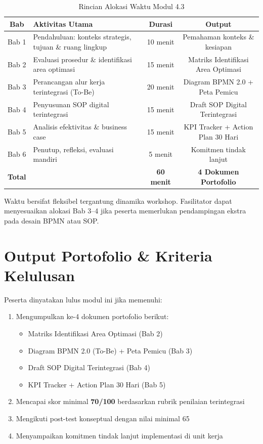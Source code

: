 \documentclass[12pt,a4paper]{report}
\begin{document}
\begin{table}[htbp]
\centering
\small
\caption{Rincian Alokasi Waktu Modul 4.3}
\begin{tabularx}{\textwidth}{@{} c X c c @{}}
\toprule
\textbf{Bab} & \textbf{Aktivitas Utama} & \textbf{Durasi} & \textbf{Output} \\
\midrule
Bab 1 & Pendahuluan: konteks strategis, tujuan \& ruang lingkup & 10 menit & Pemahaman konteks \& kesiapan \\
Bab 2 & Evaluasi prosedur \& identifikasi area optimasi & 15 menit & Matriks Identifikasi Area Optimasi \\
Bab 3 & Perancangan alur kerja terintegrasi (To-Be) & 20 menit & Diagram BPMN 2.0 + Peta Pemicu \\
Bab 4 & Penyusunan SOP digital terintegrasi & 15 menit & Draft SOP Digital Terintegrasi \\
Bab 5 & Analisis efektivitas \& business case & 15 menit & KPI Tracker + Action Plan 30 Hari \\
Bab 6 & Penutup, refleksi, evaluasi mandiri & 5 menit & Komitmen tindak lanjut \\
\midrule
\textbf{Total} & & \textbf{60 menit} & \textbf{4 Dokumen Portofolio} \\
\bottomrule
\end{tabularx}
\end{table}

\begin{warnbox}
Waktu bersifat fleksibel tergantung dinamika workshop. Fasilitator dapat menyesuaikan alokasi Bab 3--4 jika peserta memerlukan pendampingan ekstra pada desain BPMN atau SOP.
\end{warnbox}

\section*{Output Portofolio \& Kriteria Kelulusan}
Peserta dinyatakan lulus modul ini jika memenuhi:

\begin{enumerate}[leftmargin=*]
    \item Mengumpulkan ke-4 dokumen portofolio berikut:
    \begin{itemize}[nosep]
        \item Matriks Identifikasi Area Optimasi (Bab 2)
        \item Diagram BPMN 2.0 (To-Be) + Peta Pemicu (Bab 3)
        \item Draft SOP Digital Terintegrasi (Bab 4)
        \item KPI Tracker + Action Plan 30 Hari (Bab 5)
    \end{itemize}
    \item Mencapai skor minimal \textbf{70/100} berdasarkan rubrik penilaian terintegrasi
    \item Mengikuti post-test konseptual dengan nilai minimal 65
    \item Menyampaikan komitmen tindak lanjut implementasi di unit kerja
\end{enumerate}
\end{document}
